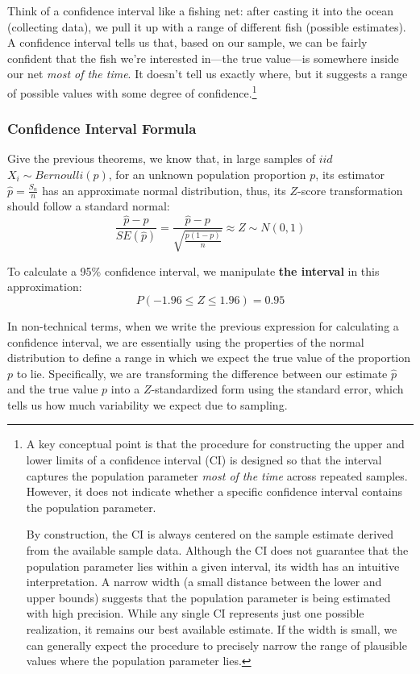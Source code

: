 \documentclass[11pt]{article}
\begin{document}
Think of a confidence interval like a fishing net: after casting it into the ocean (collecting data), we pull it up with a range of different fish (possible estimates). A confidence interval tells us that, based on our sample, we can be fairly confident that the fish we're interested in—the true value—is somewhere inside our net \emph{most of the time}. It doesn't tell us exactly where, but it suggests a range of possible values with some degree of confidence.\footnote{A key conceptual point is that the procedure for constructing the upper and lower limits of a confidence interval (CI) is designed so that the interval captures the population parameter \emph{most of the time} across repeated samples. However, it does not indicate whether a specific confidence interval contains the population parameter. 

By construction, the CI is always centered on the sample estimate derived from the available sample data. Although the CI does not guarantee that the population parameter lies within a given interval, its width has an intuitive interpretation. A narrow width (a small distance between the lower and upper bounds) suggests that the population parameter is being estimated with high precision. While any single CI represents just one possible realization, it remains our best available estimate. If the width is small, we can generally expect the procedure to precisely narrow the range of plausible values where the population parameter lies.}


\subsubsection*{Confidence Interval Formula}
Give the previous theorems, we know that, in large samples of $iid$ $X_i\sim Bernoulli (p)$, for an unknown population proportion \(p\), its estimator \(\hat{p} = \frac{S_n}{n}\) has an approximate normal distribution, thus, its $Z$-score transformation should follow a standard normal:
\[ \frac{\hat{p}-p}{SE(\hat{p})} = \frac{\hat{p} - p}{\sqrt{\frac{p(1-p)}{n}}} \approx Z \sim N(0,1) \]

To calculate a 95\% confidence interval, we manipulate \textbf{the interval} in this approximation:
\[ P(-1.96 \leq Z \leq 1.96) = 0.95 \]

In non-technical terms, when we write the previous expression for calculating a confidence interval, we are essentially using the properties of the normal distribution to define a range in which we expect the true value of the proportion \( p \) to lie. Specifically, we are transforming the difference between our estimate \( \hat{p} \) and the true value \( p \) into a $Z$-standardized form using the standard error, which tells us how much variability we expect due to sampling.
\end{document}
